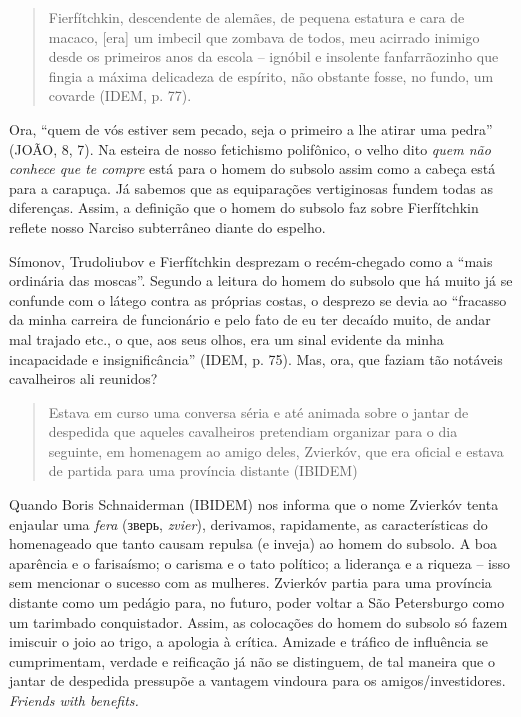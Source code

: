 \begin{quote}
Fierfítchkin, descendente de alemães, de pequena estatura e cara de
macaco, {[}era{]} um imbecil que zombava de todos, meu acirrado inimigo
desde os primeiros anos da escola -- ignóbil e insolente fanfarrãozinho
que fingia a máxima delicadeza de espírito, não obstante fosse, no
fundo, um covarde (IDEM, p. 77).
\end{quote}

Ora, ``quem de vós estiver sem pecado, seja o primeiro a lhe atirar uma
pedra'' (JOÃO, 8, 7). Na esteira de nosso fetichismo polifônico, o velho
dito \emph{quem não conhece que te compre} está para o homem do subsolo
assim como a cabeça está para a carapuça. Já sabemos que as equiparações
vertiginosas fundem todas as diferenças. Assim, a definição que o homem
do subsolo faz sobre Fierfítchkin reflete nosso Narciso subterrâneo
diante do espelho.

Símonov, Trudoliubov e Fierfítchkin desprezam o recém-chegado como a
``mais ordinária das moscas''. Segundo a leitura do homem do subsolo que
há muito já se confunde com o látego contra as próprias costas, o
desprezo se devia ao ``fracasso da minha carreira de funcionário e pelo
fato de eu ter decaído muito, de andar mal trajado etc., o que, aos seus
olhos, era um sinal evidente da minha incapacidade e insignificância''
(IDEM, p. 75). Mas, ora, que faziam tão notáveis cavalheiros ali
reunidos?

\begin{quote}
Estava em curso uma conversa séria e até animada sobre o jantar de
despedida que aqueles cavalheiros pretendiam organizar para o dia
seguinte, em homenagem ao amigo deles, Zvierkóv, que era oficial e
estava de partida para uma província distante (IBIDEM)
\end{quote}

Quando Boris Schnaiderman (IBIDEM) nos informa que o nome Zvierkóv tenta
enjaular uma \emph{fera}
(зверь,
\emph{zvier}), derivamos, rapidamente, as características do homenageado
que tanto causam repulsa (e inveja) ao homem do subsolo. A boa aparência
e o farisaísmo; o carisma e o tato político; a liderança e a riqueza --
isso sem mencionar o sucesso com as mulheres. Zvierkóv partia para uma
província distante como um pedágio para, no futuro, poder voltar a São
Petersburgo como um tarimbado conquistador. Assim, as colocações do
homem do subsolo só fazem imiscuir o joio ao trigo, a apologia à
crítica. Amizade e tráfico de influência se cumprimentam, verdade e
reificação já não se distinguem, de tal maneira que o jantar de
despedida pressupõe a vantagem vindoura para os amigos/investidores.
\emph{Friends with benefits.}

